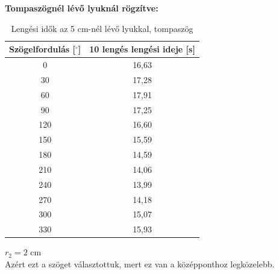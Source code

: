 \documentclass{article}
\begin{document}
\vspace{0.5em}
\noindent
\textbf{Tompaszögnél lévő lyuknál rögzítve:}
\begin{table}[H]
    \centering
    \begin{tabular}{|c|c|}
        \hline
        Szögelfordulás [$^\circ$] & 10 lengés lengési ideje [s] \\ \hline
        0                         & 16,63                       \\ \hline 
        30                        & 17,28                       \\ \hline
        60                        & 17,91                       \\ \hline 
        90                        & 17,25                       \\ \hline
        120                       & 16,60                       \\ \hline 
        150                       & 15,59                       \\ \hline
        180                       & 14,59                       \\ \hline
        210                       & 14,06                       \\ \hline
        240                       & 13,99                       \\ \hline
        270                       & 14,18                       \\ \hline
        300                       & 15,07                       \\ \hline
        330                       & 15,93                       \\ \hline
    \end{tabular}
    \caption{Lengési idők az 5 cm-nél lévő lyukkal, tompaszög}
    \label{tab:lengesiido_1.2}
\end{table}

\vspace{1em}
\noindent
$r_{2} = 2 \text{ cm}$ \\
Azért ezt a szöget választottuk, mert ez van a középponthoz legközelebb.
\end{document}
